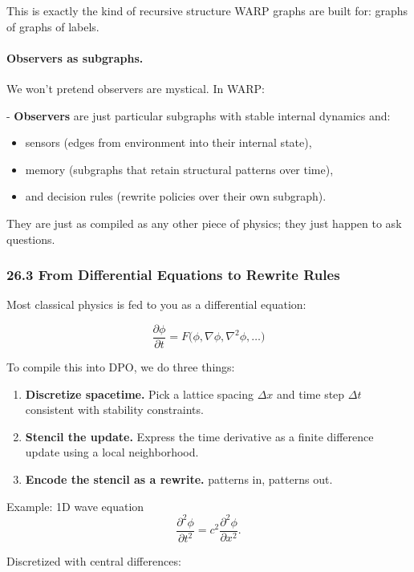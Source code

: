 This is exactly the kind of recursive structure WARP graphs are built for: graphs of graphs of labels.

\paragraph{Observers as subgraphs.}

We won’t pretend observers are mystical. In WARP:

- \textbf{Observers} are just particular subgraphs with stable internal dynamics and:
  \begin{itemize}
    \item sensors (edges from environment into their internal state),
    \item memory (subgraphs that retain structural patterns over time),
    \item and decision rules (rewrite policies over their own subgraph).
  \end{itemize}

They are just as compiled as any other piece of physics; they just happen to ask questions.

\subsubsection*{26.3  From Differential Equations to Rewrite Rules}

Most classical physics is fed to you as a differential equation:

\[
  \frac{\partial \phi}{\partial t} = F\big(\phi, \nabla\phi, \nabla^2\phi, \dots\big)
\]

To compile this into DPO, we do three things:

\begin{enumerate}
  \item \textbf{Discretize spacetime.} Pick a lattice spacing $\Delta x$ and time step $\Delta t$ consistent with stability constraints.
  \item \textbf{Stencil the update.} Express the time derivative as a finite difference update using a local neighborhood.
  \item \textbf{Encode the stencil as a rewrite.} patterns in, patterns out.
\end{enumerate}

Example: 1D wave equation
\[
  \frac{\partial^2 \phi}{\partial t^2} = c^2 \frac{\partial^2 \phi}{\partial x^2}.
\]

Discretized with central differences:

